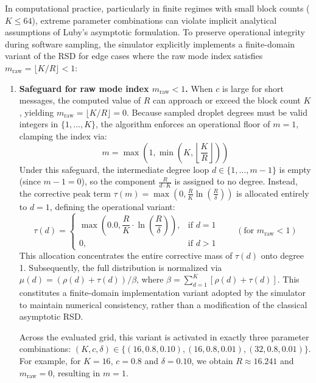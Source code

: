 In computational practice, particularly in finite regimes with small block counts ($K \le 64$), extreme parameter combinations can violate implicit analytical assumptions of Luby's asymptotic formulation. To preserve operational integrity during software sampling, the simulator explicitly implements a finite-domain variant of the RSD for edge cases where the raw mode index satisfies $m_{\text{raw}} = \lfloor K/R \rfloor < 1$:
\begin{enumerate}
    \item \textbf{Safeguard for raw mode index $m_{\text{raw}} < 1$.} When $c$ is large for short messages, the computed value of $R$ can approach or exceed the block count $K$, yielding $m_{\text{raw}} = \lfloor K/R \rfloor = 0$. Because sampled droplet degrees must be valid integers in $\{1, \ldots, K\}$, the algorithm enforces an operational floor of $m = 1$, clamping the index via:
    \begin{equation}
        \label{eq:m_adaptado}
        m = \max\left(1, \min\left(K, \left\lfloor\frac{K}{R}\right\rfloor\right)\right)
    \end{equation}
    Under this safeguard, the intermediate degree loop $d \in \{1, \ldots, m-1\}$ is empty (since $m - 1 = 0$), so the component $\frac{R}{d \cdot K}$ is assigned to no degree. Instead, the corrective peak term $\tau(m) = \max\left(0, \frac{R}{K}\ln\left(\frac{R}{\delta}\right)\right)$ is allocated entirely to $d = 1$, defining the operational variant:
    \begin{equation}
        \label{eq:tau_modificado_caso1}
        \tau(d) = \begin{cases}
            \max\left(0.0, \dfrac{R}{K} \cdot \ln\!\left(\dfrac{R}{\delta}\right)\right), & \text{if } d = 1 \\[10pt]
            0, & \text{if } d > 1
        \end{cases}
        \qquad (\text{for } m_{\text{raw}} < 1)
    \end{equation}
    This allocation concentrates the entire corrective mass of $\tau(d)$ onto degree 1. Subsequently, the full distribution is normalized via $\mu(d) = (\rho(d) + \tau(d)) / \beta$, where $\beta = \sum_{d=1}^K [\rho(d) + \tau(d)]$. This constitutes a finite-domain implementation variant adopted by the simulator to maintain numerical consistency, rather than a modification of the classical asymptotic RSD.
    
    Across the evaluated grid, this variant is activated in exactly three parameter combinations: $(K, c, \delta) \in \{(16, 0.8, 0.10), (16, 0.8, 0.01), (32, 0.8, 0.01)\}$. For example, for $K = 16$, $c = 0.8$ and $\delta = 0.10$, we obtain $R \approx 16.241$ and $m_{\text{raw}} = 0$, resulting in $m = 1$.
    

\end{enumerate}
